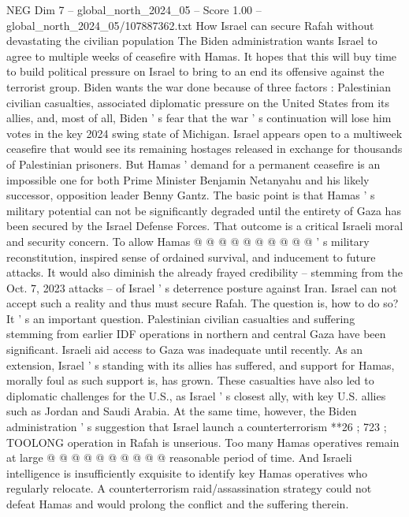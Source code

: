 \begin{textsample}{NEG Dim 7 – global\_north\_2024\_05 – Score 1.00 – global\_north\_2024\_05/107887362.txt}  \label{ex:f7_neg_397}
How Israel can secure Rafah without devastating the civilian population The Biden administration wants Israel to agree to multiple weeks of ceasefire with Hamas.
It hopes that this will buy time to build political pressure on Israel to bring to an end its offensive against the terrorist group.
Biden wants the war done because of three factors : Palestinian civilian casualties, associated diplomatic pressure on the United States from its allies, and, most of all, Biden ' s fear that the war ' s continuation will lose him votes in the key 2024 swing state of Michigan.
Israel appears open to a multiweek ceasefire that would see its remaining hostages released in exchange for thousands of Palestinian prisoners.
But Hamas ' demand for a permanent ceasefire is an impossible one for both Prime Minister Benjamin Netanyahu and his likely successor, opposition leader Benny Gantz.
The basic point is that Hamas ' s military potential can not be significantly degraded until the entirety of Gaza has been secured by the Israel Defense Forces.
That outcome is a critical Israeli moral and security concern.
To allow Hamas @ @ @ @ @ @ @ @ @ @ ' s military reconstitution, inspired sense of ordained survival, and inducement to future attacks.
It would also diminish the already frayed credibility -- stemming from the Oct. 7, 2023 attacks -- of Israel ' s deterrence posture against Iran.
Israel can not accept such a reality and thus must secure Rafah.
The question is, how to do so?
It ' s an important question.
Palestinian civilian casualties and suffering stemming from earlier IDF operations in northern and central Gaza have been significant.
Israeli aid access to Gaza was inadequate until recently.
As an extension, Israel ' s standing with its allies has suffered, and support for Hamas, morally foul as such support is, has grown.
These casualties have also led to diplomatic challenges for the U.S., as Israel ' s closest ally, with key U.S. allies such as Jordan and Saudi Arabia.
At the same time, however, the Biden administration ' s suggestion that Israel launch a counterterrorism **26 ; 723 ; TOOLONG operation in Rafah is unserious.
Too many Hamas operatives remain at large @ @ @ @ @ @ @ @ @ @ reasonable period of time.
And Israeli intelligence is insufficiently exquisite to identify key Hamas operatives who regularly relocate.
A counterterrorism raid/assassination strategy could not defeat Hamas and would prolong the conflict and the suffering therein.

\end{textsample}
